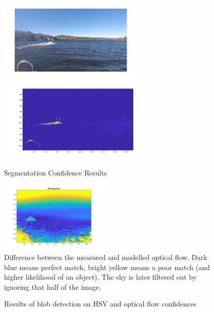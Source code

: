 \documentclass[conference]{IEEEtran}
\begin{document}
\begin{figure}[H]
\includegraphics[width=7cm]{hsv_kmeans2_orig}
\includegraphics[width=7.5cm]{hsv_kmeans2_suppressed}
\centering
\caption{Segmentation Confidence Results}
\label{fig:boatconf}
\end{figure}

\begin{figure}
\centering
\includegraphics[width=0.45\textwidth]{diff_magnitude}
\caption{Difference between the measured and modelled optical flow.
         Dark blue means perfect match, bright yellow means a poor match (and
         higher likelihood of an object).
         The sky is later filtered out by ignoring that half of the image.}
\label{fig:diff_magnitude}
\end{figure}

\begin{figure}
\hfill
{}
\hfill
{}
\hfill
\caption{Results of blob detection on HSV and optical flow confidences}
\label{fig:blobs}
\end{figure}
\end{document}
